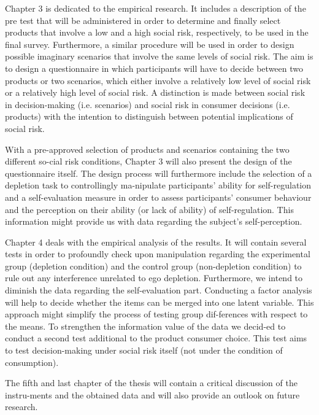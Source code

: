 Chapter 3 is dedicated to the empirical research. It includes a description of the pre test that will be administered in order to determine and finally select products that involve a low and a high social risk, respectively, to be used in the final survey. Furthermore, a similar procedure will be used in order to design possible imaginary scenarios that involve the same levels of social risk. The aim is to design a questionnaire in which participants will have to decide between two products or two scenarios, which either involve a relatively low level of social risk or a relatively high level of social risk. A distinction is made between social risk in decision-making \citep{danziger2011extraneous} (i.e. scenarios) and social risk in consumer decisions (i.e. products) with the intention to distinguish between potential implications of social risk.\par
With a pre-approved selection of products and scenarios containing the two different so-cial risk conditions, Chapter 3 will also present the design of the questionnaire itself. The design process will furthermore include the selection of a depletion task to controllingly ma-nipulate participants’ ability for self-regulation and a self-evaluation measure in order to assess participants’ consumer behaviour and the perception on their ability (or lack of ability) of self-regulation. This information might provide us with data regarding the subject’s self-perception.\par
Chapter 4 deals with the empirical analysis of the results. It will contain several tests in order to profoundly check upon manipulation regarding the experimental group (depletion condition) and the control group (non-depletion condition) to rule out any interference unrelated to ego depletion. Furthermore, we intend to diminish the data regarding the self-evaluation part. Conducting a factor analysis will help to decide whether the items can be merged into one latent variable. This approach might simplify the process of testing group dif-ferences with respect to the means. To strengthen the information value of the data we decid-ed to conduct a second test additional to the product consumer choice. This test aims to test decision-making under social risk itself  (not under the condition of consumption).\par
The fifth and last chapter of the thesis will contain a critical discussion of the instru-ments and the obtained data and will also provide an outlook on future research.\par